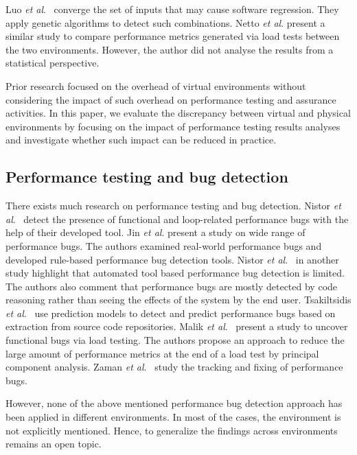 \documentclass[smallextended]{svjour3}       %
\begin{document}
Luo \textit{et al$.$}~\cite{Luo:2016:MPR:2901739.2901765} converge the set of inputs that may cause software regression. They apply genetic algorithms to detect such combinations. Netto \textit{et al$.$} \cite{netto2011evaluating} present a similar study to compare performance metrics generated via load tests between the two environments. However, the author did not analyse the results from a statistical perspective.

Prior research focused on the overhead of virtual environments without considering the impact of such overhead on performance testing and assurance activities. In this paper, we evaluate the discrepancy between virtual and physical environments by focusing on the impact of performance testing results analyses and investigate whether such impact can be reduced in practice.


\subsection{Performance testing and bug detection}

There exists much research on performance testing and bug detection. Nistor \textit{et al$.$}~\cite{Nistor} detect the presence of functional and loop-related performance bugs with the help of their developed tool. Jin \textit{et al$.$} \cite{Jin} present a study on wide range of performance bugs. The authors examined real-world performance bugs and developed rule-based performance bug detection tools. Nistor \textit{et al$.$}~\cite{nistor_2} in another study highlight that automated tool based performance bug detection is limited. The authors also comment that performance bugs are mostly detected by code reasoning rather than seeing the effects of the system by the end user. Tsakiltsidis \textit{et al$.$}~\cite{Tsakiltsidis} use prediction models to detect and predict performance bugs based on extraction from source code repositories. Malik \textit{et al$.$}~\cite{h_malik_p_bugs} present a study to uncover functional bugs via load testing. The authors propose an approach to reduce the large amount of performance metrics at the end of a load test by principal component analysis. Zaman \textit{et al$.$}~\cite{zaman_p_bugs} study the tracking and fixing of performance bugs.

However, none of the above mentioned performance bug detection approach has been applied in different environments. In most of the cases, the environment is not explicitly mentioned. Hence, to generalize the findings across environments remains an open topic.
\end{document}
